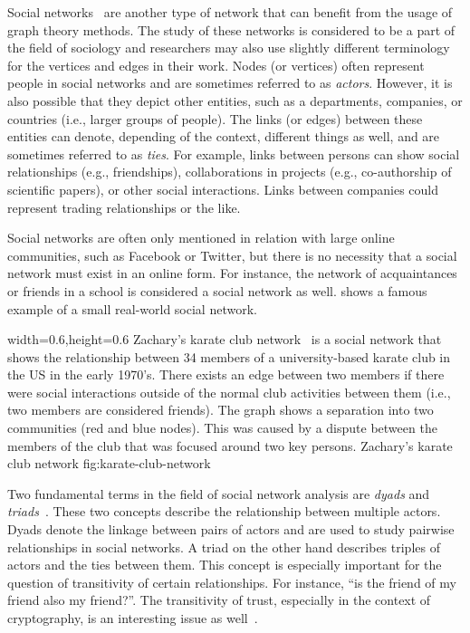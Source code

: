 Social networks~\cite{Newman2010} are another type of network that can benefit from the usage of graph theory methods.
The study of these networks is considered to be a part of the field of sociology and researchers may also use slightly different terminology for the vertices and edges in their work.
Nodes (or vertices) often represent people in social networks and are sometimes referred to as \emph{actors}.
However, it is also possible that they depict other entities, such as a departments, companies, or countries (i.e., larger groups of people).
The links (or edges) between these entities can denote, depending of the context, different things as well, and are sometimes referred to as \emph{ties}.
For example, links between persons can show social relationships (e.g., friendships), collaborations in projects (e.g., co-authorship of scientific papers), or other social interactions.
Links between companies could represent trading relationships or the like.

Social networks are often only mentioned in relation with large online communities, such as Facebook or Twitter, but there is no necessity that a social network must exist in an online form.
For instance, the network of acquaintances or friends in a school is considered a social network as well.
 shows a famous example of a small real-world social network.


      {width=0.6\textwidth,height=0.6\textheight}
      {Zachary's karate club network~\cite{Zachary1977} is a social network that shows the relationship between 34 members of a university-based karate club in the US in the early 1970's.
      There exists an edge between two members if there were social interactions outside of the normal club activities between them (i.e., two members are considered friends).
      The graph shows a separation into two communities (red and blue nodes). This was caused by a dispute between the members of the club that was focused around two key persons.}
      {Zachary's karate club network}
      {fig:karate-club-network}


Two fundamental terms in the field of social network analysis are \emph{dyads} and \emph{triads}~\cite{Wasserman1994}.
These two concepts describe the relationship between multiple actors.
Dyads denote the linkage between pairs of actors and are used to study  pairwise relationships in social networks.
A triad on the other hand describes triples of actors and the ties between them.
This concept is especially important for the question of transitivity of certain relationships.
For instance, \enquote{is the friend of my friend also my friend?}.
The transitivity of trust, especially in the context of cryptography, is an interesting issue as well~\cite{Christianson1997}.

